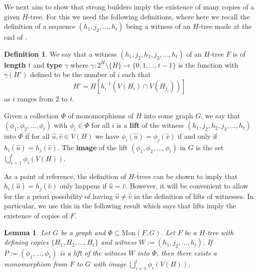 \documentclass[12pt,letterpaper]{article}
\newtheorem{lemma}[theorem]{Lemma}
\theoremstyle{definition}
\newtheorem{definition}{Definition}
\newcommand{\sm}{\setminus}
\begin{document}
	We next aim to show that strong builders imply the existence of many copies of a given $H$-tree.  For this we need the following definitions, where here we recall the definition of a sequence $(h_1,j_2,\ldots,h_t)$ being a witness of an $H$-tree made at the end of . 
	\begin{definition}
		We say that a witness $(h_1,j_2,h_2,j_3,\dots,h_t)$ of an $H$-tree $F$ is of \textbf{length} $t$ and \textbf{type} $\gamma$ where $\gamma:2^H\sm \{H\}\to\{0,1,\ldots,t-1\}$ is the function with $\gamma(H')$ defined to be the number of $i$ such that 
		\[
		H'=H[h_i^{-1}(V(H_i)\cap V(H_{j_i}))]
		\] 
		as $i$ ranges from $2$ to $t$. 
		
		Given a collection $\Phi$ of monomorphisms of $H$ into some graph $G$, we say that $(\phi_1,\phi_2,\dots,\phi_t)$ with $\phi_i\in \Phi$ for all $i$ is a \textbf{lift} of the witness $(h_1,j_2,h_2,j_3,\dots,h_t)$ into $\Phi$ if for all $\hat{u},\hat{v}\in V(H)$ we have $\phi_i(\hat{u})=\phi_j(\hat{v})$ if and only if $h_i(\hat{u})=h_j(\hat{v})$. The \textbf{image} of the lift $(\phi_1,\phi_2,\dots,\phi_t)$ in $G$ is the set $\bigcup_{i=1}^t \phi_i(V(H))$.
	\end{definition}
	
	
	As a point of reference, the definition of $H$-trees can be shown to imply that $h_i(\hat{u})=h_j(\hat{v})$ only happens if $\hat{u}=\hat{v}$.  However, it will be convenient to allow for the a priori possibility of having $\hat{u}\ne \hat{v}$ in the definition of lifts of witnesses.  In particular, we use this in the following result which says that lifts imply the existence of copies of $F$.
	
	\begin{lemma}\label{lemma copy implies mono}
		Let $G$ be a graph and $\Phi\subseteq \mathrm{Mon}(F,G)$. Let $F$ be a $H$-tree with defining copies $\{H_1,H_2,\dots,H_t\}$ and witness $W:=(h_1,j_2,\ldots,h_t)$. If $P:=(\phi_1,\ldots,\phi_t)$ is a lift of the witness $W$ into $\Phi$, then there exists a monomorphism from $F$ to $G$ with image $\displaystyle\bigcup_{i=1}^t \phi_i(V(H))$.
	\end{lemma}
	
\end{document}
